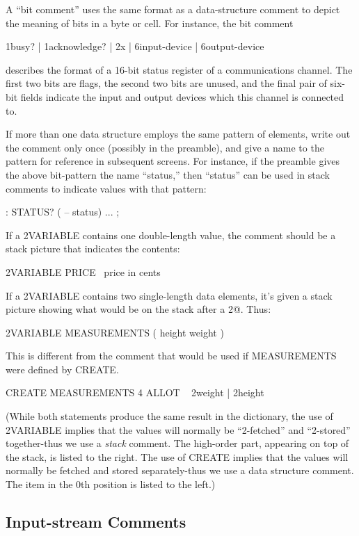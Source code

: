 A ``bit comment'' uses the same format as a data-structure comment
to depict the meaning of bits in a byte or cell.  For instance, the bit
comment
\begin{Code}
{ 1busy? | 1acknowledge? | 2x | 6input-device |
   6output-device }
\end{Code}
describes the format of a 16-bit status register of a communications channel.
The first two bits are flags, the second two bits are unused, and the
final pair of six-bit fields indicate the input and output devices which this
channel is connected to.

If more than one data structure employs the same pattern of elements,
write out the comment only once (possibly in the preamble), and
give a name to the pattern for reference in subsequent screens.  For instance,
if the preamble gives the above bit-pattern the name ``status,''
then ``status'' can be used in stack comments to indicate values with that
pattern:
\begin{Code}
: STATUS?  ( -- status) ... ;
\end{Code}
If a 2VARIABLE contains one double-length value, the comment should
be a stack picture that indicates the contents:
\begin{Code}
2VARIABLE PRICE  \ price in cents
\end{Code}
If a 2VARIABLE contains two single-length data elements, it's given a
stack picture showing what would be on the stack after a 2@.  Thus:
\begin{Code}
2VARIABLE MEASUREMENTS  ( height weight )
\end{Code}
This is different from the comment that would be used if
MEASUREMENTS were defined by CREATE.
\begin{Code}
CREATE MEASUREMENTS 4 ALLOT  \ { 2weight | 2height }
\end{Code}
(While both statements produce the same result in the dictionary, the use
of 2VARIABLE implies that the values will normally be ``2-fetched'' and
``2-stored'' together-thus we use a \emph{stack} comment.  The high-order part,
appearing on top of the stack, is listed to the right.  The use of CREATE
implies that the values will normally be fetched and stored
separately-thus we use a data structure comment.  The item in the 0th
position is listed to the left.)

\subsection{Input-stream Comments}

